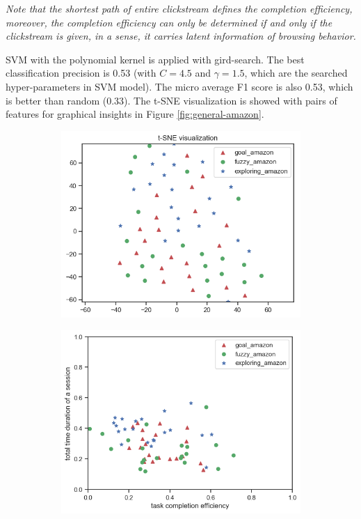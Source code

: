 \emph{Note that the shortest path of entire clickstream defines the completion efficiency,
 moreover, the completion efficiency can only be determined if and only if the clickstream
 is given, in a sense, it carries latent information of browsing behavior.}

SVM with the polynomial kernel is applied with gird-search.
The best classification precision is 0.53 (with $C=4.5$ and $\gamma = 1.5$, 
which are the searched hyper-parameters in SVM model).
The micro average F1 score is also 0.53, which is better than random (0.33).
The t-SNE visualization is showed with pairs of features for graphical insights
in Figure \ref{fig:general-amazon}.

\begin{figure}
    \centering

    \begin{subfigure}[b]{0.45\textwidth}
        \includegraphics[width=1\textwidth]{figures/tsne-amazon}
        \caption{}
        \label{fig:tsne-amazon}
    \end{subfigure}
    \begin{subfigure}[b]{0.45\textwidth}
        \includegraphics[width=1\textwidth]{figures/2d-eff-dur-amazon}

\end{subfigure}
\end{figure}
